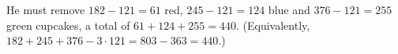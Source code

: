 He must remove $182-121=61$ red, $245-121=124$ blue and $376-121=255$ green cupcakes, a total of $61+124+255=\boxed{440}$. (Equivalently, $182+245+376-3\cdot121=803-363=440$.)
